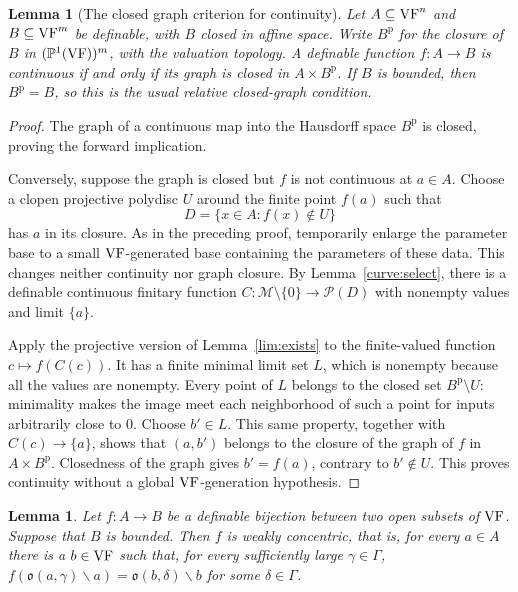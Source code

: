\documentclass[12pt]{amsart}
\theoremstyle{plain}
\newtheorem{lem}[thm]{Lemma}
\theoremstyle{definition}
\theoremstyle{remark}
\numberwithin{equation}{section}
\theoremstyle{plain}
\newcommand{\VF}{\textup{VF}}
\newcommand{\MM}{\mdl M}
\newcommand{\go}{\mathfrak{o}}
\newcommand{\0}{\emptyset}
\newcommand{\mdl}[1]{\mathcal{#1}}  %
\newcommand{\fun}{\longrightarrow}
\newcommand{\efun}{\longmapsto}
\newcommand{\mi}{\smallsetminus}
\begin{document}
\begin{lem}[The closed graph criterion for continuity]\label{closed:gra}
Let $A\subseteq\VF^n$ and $B\subseteq\VF^m$ be definable, with $B$ closed in affine space. Write $B^{\mathrm p}$ for the closure of $B$ in $(\mathbb P^1(\VF))^m$, with the valuation topology. A definable function $f:A\fun B$ is continuous if and only if its graph is closed in $A\times B^{\mathrm p}$. If $B$ is bounded, then $B^{\mathrm p}=B$, so this is the usual relative closed-graph condition.
\end{lem}
\begin{proof}
The graph of a continuous map into the Hausdorff space $B^{\mathrm p}$ is closed, proving the forward implication.

Conversely, suppose the graph is closed but $f$ is not continuous at $a\in A$. Choose a clopen projective polydisc $U$ around the finite point $f(a)$ such that
\[
D=\{x\in A:f(x)\notin U\}
\]
has $a$ in its closure. As in the preceding proof, temporarily enlarge the parameter base to a small $\VF$-generated base containing the parameters of these data. This changes neither continuity nor graph closure. By Lemma~\ref{curve:select}, there is a definable continuous finitary function $C:\MM\setminus\{0\}\fun\mdl P(D)$ with nonempty values and limit $\{a\}$.

Apply the projective version of Lemma~\ref{lim:exists} to the finite-valued function $c\efun f(C(c))$. It has a finite minimal limit set $L$, which is nonempty because all the values are nonempty. Every point of $L$ belongs to the closed set $B^{\mathrm p}\setminus U$: minimality makes the image meet each neighborhood of such a point for inputs arbitrarily close to $0$. Choose $b'\in L$. This same property, together with $C(c)\to\{a\}$, shows that $(a,b')$ belongs to the closure of the graph of $f$ in $A\times B^{\mathrm p}$. Closedness of the graph gives $b'=f(a)$, contrary to $b'\notin U$. This proves continuity without a global $\VF$-generation hypothesis.
\end{proof}


\begin{lem}\label{lim:weak}
Let $f : A  \fun B$ be a definable bijection between two open subsets of $\VF$. Suppose that $B$ is bounded. Then $f$ is weakly concentric, that is, for every $a \in A$ there is a $b \in \VF$ such that, for every sufficiently large $\gamma \in \Gamma$, $f(\go(a, \gamma) \mi a) = \go(b, \delta) \mi b$ for some $\delta \in \Gamma$.
\end{lem}
\end{document}
